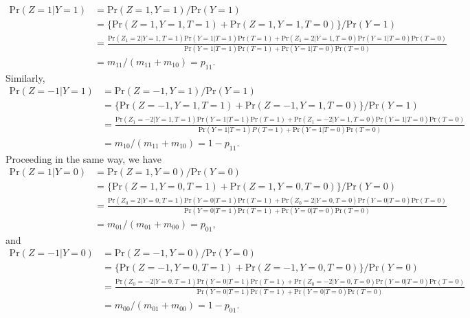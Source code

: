 \documentclass{article}
\begin{document}
\begin{align*}
  \mathrm{Pr}( Z = 1 | Y=1 )  & = \mathrm{Pr}( Z =1 , Y=1 ) / \mathrm{Pr}(Y = 1)\\
    & = \{\mathrm{Pr}( Z=1, Y=1, T=1 ) + \mathrm{Pr}(Z=1, Y=1, T=0)\} / \mathrm{Pr}(Y=1) \\
    & = \tfrac{\mathrm{Pr}(Z_1=2 | Y=1, T=1)\mathrm{Pr}(Y=1 | T=1) \mathrm{Pr}(T=1)  + \mathrm{Pr}(Z_1=2 | Y=1, T=0)\mathrm{Pr}(Y=1 | T=0) \mathrm{Pr}(T=0)}
  { \mathrm{Pr}(Y=1|T=1)\mathrm{Pr}(T=1) + \mathrm{Pr}(Y=1 | T=0) \mathrm{Pr}(T=0) } \\
    & = m_{11} / ( m_{11} + m_{10}) = p_{11}.
\end{align*}
Similarly,
\begin{align*}
  \mathrm{Pr}( Z = -1 | Y=1 ) & = \mathrm{Pr}( Z =-1 , Y=1 ) / \mathrm{Pr}(Y = 1) \\
  & = \{\mathrm{Pr}( Z=-1, Y=1, T=1 ) + \mathrm{Pr}(Z=-1, Y=1, T=0)\} / \mathrm{Pr}(Y=1) \\
  & = \tfrac{\mathrm{Pr}(Z_1=-2 | Y=1, T=1)\mathrm{Pr}(Y=1 | T=1) \mathrm{Pr}(T=1) + \mathrm{Pr}(Z_1=-2 | Y=1, T=0)\mathrm{Pr}(Y=1 | T=0) \mathrm{Pr}(T=0) }
  { \mathrm{Pr}(Y=1|T=1)P(T=1) +  \mathrm{Pr}(Y=1 | T=0)  \mathrm{Pr}(T=0) } \\
  & = m_{10} / ( m_{11} + m_{10}) = 1 - p_{11}.
\end{align*}
Proceeding in the same way, we have
\begin{align*}
  \mathrm{Pr}( Z = 1 | Y=0 ) & =  \mathrm{Pr}( Z =1 , Y=0 ) /  \mathrm{Pr}(Y = 0)  \\
  & = \{ \mathrm{Pr}( Z=1, Y=0, T=1 ) +  \mathrm{Pr}(Z=1, Y=0, T=0)\}/  \mathrm{Pr}(Y=0) \\
  & = \tfrac{ \mathrm{Pr}(Z_0=2 | Y=0, T=1) \mathrm{Pr}(Y=0 | T=1)  \mathrm{Pr}(T=1) +  \mathrm{Pr}(Z_0=2 | Y=0, T=0) \mathrm{Pr}(Y=0 | T=0)  \mathrm{Pr}(T=0) }
  {  \mathrm{Pr}(Y=0|T=1) \mathrm{Pr}(T=1) +  \mathrm{Pr}(Y=0 | T=0)  \mathrm{Pr}(T=0)} \\
  & = m_{01} / ( m_{01} + m_{00}) = p_{01},
\end{align*}
and
\begin{align*}
   \mathrm{Pr}( Z = -1 | Y=0 ) & =  \mathrm{Pr}( Z =-1 , Y=0 ) /  \mathrm{Pr}(Y = 0)  \\
  & = \{ \mathrm{Pr}( Z=-1, Y=0, T=1 ) +  \mathrm{Pr}(Z=-1, Y=0, T=0)\}/ \mathrm{Pr}(Y=0) \\
  & = \tfrac{ \mathrm{Pr}(Z_0=-2 | Y=0, T=1) \mathrm{Pr}(Y=0 | T=1)  \mathrm{Pr}(T=1) +  \mathrm{Pr}(Z_0=-2 | Y=0, T=0) \mathrm{Pr}(Y=0 | T=0)  \mathrm{Pr}(T=0) }
  { \mathrm{Pr}(Y=0|T=1) \mathrm{Pr}(T=1) +  \mathrm{Pr}(Y=0 | T=0)  \mathrm{Pr}(T=0) }\\
  & = m_{00} / ( m_{01} + m_{00}) = 1 - p_{01}.
\end{align*}
\end{document}
